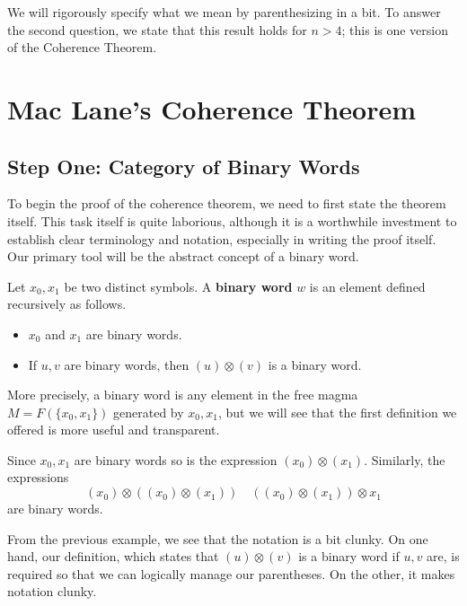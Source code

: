 We will rigorously specify what we mean by parenthesizing in a bit. To answer 
the second question, we state that this result holds for $n > 4$; this is one version of 
the Coherence Theorem. 



\newpage
\section{Mac Lane's Coherence Theorem}\label{section:coherence_theorem}
\subsection*{Step One: Category of Binary Words}
To begin the proof of the coherence theorem, we need to first state 
the theorem itself. This task itself is quite laborious, although it is a worthwhile 
investment to establish clear terminology and notation, especially in writing the 
proof itself. Our primary tool will be the abstract concept of a binary 
word. 

\begin{definition}
    Let $x_0, x_1$ be two distinct symbols. A \textbf{binary word} $w$ 
    is an element defined recursively as follows.
    \begin{itemize}
        \item $x_0$ and $x_1$ are binary words. 
        \item If $u, v$ are binary words, then $(u) \otimes (v)$ is a binary word.
    \end{itemize}
    More precisely, a binary word is any element in the 
    free magma $M = F(\{x_0,x_1\})$ generated by $x_0,x_1$, but we will see 
    that the first definition we offered is more useful and transparent.
\end{definition}

\begin{example}
    Since $x_0, x_1$ are binary words so is the expression $(x_0)\otimes (x_1)$.
    Similarly, the expressions 
    \[
        (x_0)\otimes((x_0)\otimes(x_1)) \quad ((x_0)\otimes(x_1))\otimes x_1   
    \]
    are binary words.
\end{example}

From the previous example, we see that the notation is a bit clunky. 
On one hand, our definition, which states
that $(u)\otimes(v)$ is a binary word if $u,v$ are, is required so that we can logically 
manage our parentheses. On the other, it makes notation clunky. 

